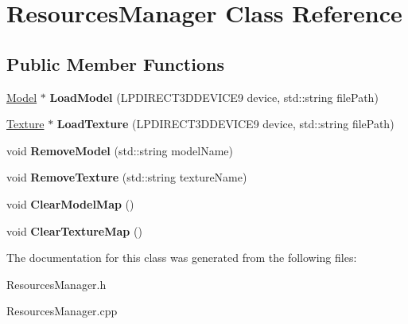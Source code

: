 \hypertarget{class_resources_manager}{\section{Resources\-Manager Class Reference}
\label{class_resources_manager}
}
\subsection*{Public Member Functions}
\begin{DoxyCompactItemize}
\item 
\hypertarget{class_resources_manager_ac0baed9d9f8c3918aba6065a9925bc6e}{\hyperlink{class_model}{Model} $\ast$ {\bfseries Load\-Model} (L\-P\-D\-I\-R\-E\-C\-T3\-D\-D\-E\-V\-I\-C\-E9 device, std\-::string file\-Path)}\label{class_resources_manager_ac0baed9d9f8c3918aba6065a9925bc6e}

\item 
\hypertarget{class_resources_manager_a8fb2bc49ca2f3f5ac5e62846ae5285b5}{\hyperlink{class_texture}{Texture} $\ast$ {\bfseries Load\-Texture} (L\-P\-D\-I\-R\-E\-C\-T3\-D\-D\-E\-V\-I\-C\-E9 device, std\-::string file\-Path)}\label{class_resources_manager_a8fb2bc49ca2f3f5ac5e62846ae5285b5}

\item 
\hypertarget{class_resources_manager_a1f33fb87d2bebf862e7e7192c0a4fa48}{void {\bfseries Remove\-Model} (std\-::string model\-Name)}\label{class_resources_manager_a1f33fb87d2bebf862e7e7192c0a4fa48}

\item 
\hypertarget{class_resources_manager_ae351e7f5d9784754dea19acb40f97eed}{void {\bfseries Remove\-Texture} (std\-::string texture\-Name)}\label{class_resources_manager_ae351e7f5d9784754dea19acb40f97eed}

\item 
\hypertarget{class_resources_manager_a18cd7c53246759bb6f11d7fd9df47eaa}{void {\bfseries Clear\-Model\-Map} ()}\label{class_resources_manager_a18cd7c53246759bb6f11d7fd9df47eaa}

\item 
\hypertarget{class_resources_manager_a4481302d87dfbb5caea6e502e4c7e39a}{void {\bfseries Clear\-Texture\-Map} ()}\label{class_resources_manager_a4481302d87dfbb5caea6e502e4c7e39a}

\end{DoxyCompactItemize}


The documentation for this class was generated from the following files\-:\begin{DoxyCompactItemize}
\item 
Resources\-Manager.\-h\item 
Resources\-Manager.\-cpp\end{DoxyCompactItemize}
